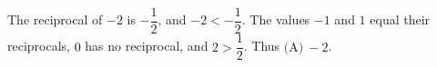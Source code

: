 The reciprocal of $-2$ is $-\dfrac{1}{2}$, and $-2<-\dfrac{1}{2}$. The values $-1$ and $1$ equal their reciprocals, $0$ has no reciprocal, and $2>\dfrac{1}{2}$. Thus $\boxed{\text{(A)}\ -2}$.
